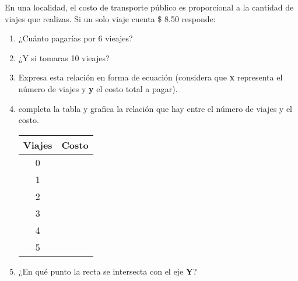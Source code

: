 
\question En una localidad, el costo
          de transporte público es proporcional a la cantidad de viajes que
          realizas. Si un solo viaje cuenta \$ 8.50 responde:

\renewcommand{\labelenumi}{\alph{enumi})}
\begin{enumerate}
  \item ¿Cuánto pagarías por 6 vieajes? \fillin[51]
  \item ¿Y si tomaras 10 vieajes? \fillin[85]
  \item Expresa esta relación en forma de ecuación (considera que \textbf{x}
        representa el número de viajes y \textbf{y} el costo total a
        pagar). \fillin[$y = 8.5x$]
  \item completa la tabla y grafica la relación que hay entre el número
        de viajes y el costo.

\begin{multicols}{2}
\begin{center}
  \begin{tabular}{|c|c|}
     \hline
     \rowcolor[HTML]{C0C0C0}
         Viajes & Costo \\
     \hline 0 &  \\
     \hline 1 &  \\
     \hline 2 &  \\
     \hline 3 &  \\
     \hline 4 &  \\
     \hline 5 &  \\
     \hline
  \end{tabular}
\end{center}

\end{multicols}


  \item ¿En qué punto la recta se intersecta con el eje \textbf{Y}?
        \fillin[(0,0)]
\end{enumerate}
